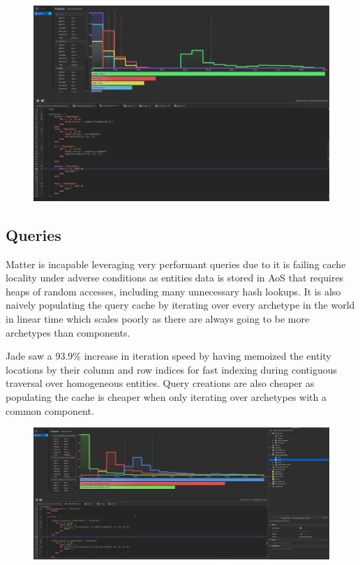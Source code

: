 \documentclass[openany, amssymb, psamsfonts]{amsart}
\theoremstyle{definition}
\numberwithin{equation}{section}
\begin{document}
\begin{figure}[htbp]
\centering
\includegraphics[scale=0.2]{../../images/insertion.png}\label{Fig 5: Insertion}
\end{figure}

\subsection{Queries}
Matter is incapable leveraging very performant queries due to it is failing cache locality 
under adverse conditions as entities data is stored in AoS that requires heaps of random accesses, 
including many unnecessary hash lookups. It is also naively populating the query cache by iterating 
over every archetype in the world in linear time which scales poorly as there are always going to 
be more archetypes than components. 

Jade saw a 93.9\% increase in iteration speed by having memoized the entity locations by their column 
and row indices for fast indexing during contiguous traversal over homogeneous entities. Query creations
are also cheaper as populating the cache is cheaper when only iterating over archetypes with a common component.

\begin{figure}[htbp]
\centering
\includegraphics[scale=0.15]{../../images/queries.png}\label{Fig 6: Queries}
\end{figure}
\end{document}
